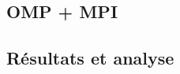 \documentclass[12pt]{article}
\begin{document}
    \subsection{OMP + MPI}
    \subsection{Résultats et analyse}

\end{document}
